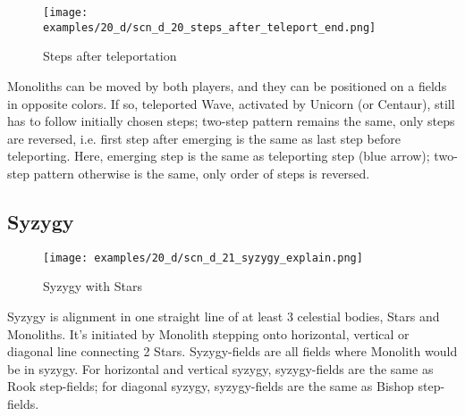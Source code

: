 \clearpage %

\vspace*{-2.3\baselineskip}
\noindent
\begin{figure}[!h]
\texttt{[image: examples/20\_d/scn\_d\_20\_steps\_after\_teleport\_end.png]}
\vspace*{-1.3\baselineskip}
\caption{Steps after teleportation}
\label{fig:scn_d_20_steps_after_teleport_end}
\end{figure}

\vspace*{-0.4\baselineskip}
Monoliths can be moved by both players, and they can be positioned on a fields in
opposite colors. If so, teleported Wave, activated by Unicorn (or Centaur), still
has to follow initially chosen steps; two-step pattern remains the same, only steps
are reversed, i.e. first step after emerging is the same as last step before
teleporting. \newline
Here, emerging step is the same as teleporting step (blue arrow); two-step pattern
otherwise is the same, only order of steps is reversed.

\clearpage %

\subsection*{Syzygy}
\label{sec:Discovery/Monolith/Syzygy}

\vspace*{-1.4\baselineskip}
\noindent
\begin{figure}[!h]
\texttt{[image: examples/20\_d/scn\_d\_21\_syzygy\_explain.png]}
\caption{Syzygy with Stars}
\label{fig:scn_d_21_syzygy_explain}
\end{figure}

Syzygy is alignment in one straight line of at least 3 celestial bodies, Stars and
Monoliths. It's initiated by Monolith stepping onto horizontal, vertical or diagonal
line connecting 2 Stars. Syzygy-fields are all fields where Monolith would be in
syzygy. For horizontal and vertical syzygy, syzygy-fields are the same as Rook
step-fields; for diagonal syzygy, syzygy-fields are the same as Bishop step-fields.

